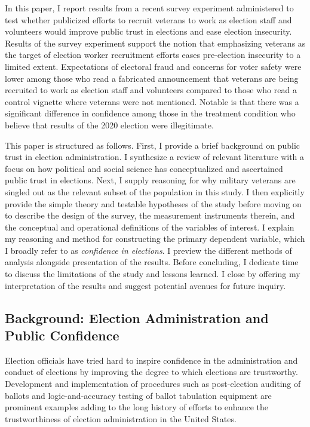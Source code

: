 \documentclass[
  12pt,
  letterpaper,
]{article}
\begin{document}
In this paper, I report results from a recent survey experiment
administered to test whether publicized efforts to recruit veterans to
work as election staff and volunteers would improve public trust in
elections and ease election insecurity. Results of the survey experiment
support the notion that emphasizing veterans as the target of election
worker recruitment efforts eases pre-election insecurity to a limited
extent. Expectations of electoral fraud and concerns for voter safety
were lower among those who read a fabricated announcement that veterans
are being recruited to work as election staff and volunteers compared to
those who read a control vignette where veterans were not mentioned.
Notable is that there was a significant difference in confidence among
those in the treatment condition who believe that results of the 2020
election were illegitimate.

This paper is structured as follows. First, I provide a brief background
on public trust in election administration. I synthesize a review of
relevant literature with a focus on how political and social science has
conceptualized and ascertained public trust in elections. Next, I supply
reasoning for why military veterans are singled out as the relevant
subset of the population in this study. I then explicitly provide the
simple theory and testable hypotheses of the study before moving on to
describe the design of the survey, the measurement instruments therein,
and the conceptual and operational definitions of the variables of
interest. I explain my reasoning and method for constructing the primary
dependent variable, which I broadly refer to as \emph{confidence in
elections}. I preview the different methods of analysis alongside
presentation of the results. Before concluding, I dedicate time to
discuss the limitations of the study and lessons learned. I close by
offering my interpretation of the results and suggest potential avenues
for future inquiry.

\subsection{Background: Election Administration and Public
Confidence}\label{background-election-administration-and-public-confidence}

Election officials have tried hard to inspire confidence in the
administration and conduct of elections by improving the degree to which
elections are trustworthy. Development and implementation of procedures
such as post-election auditing of ballots and logic-and-accuracy testing
of ballot tabulation equipment are prominent examples adding to the long
history of efforts to enhance the trustworthiness of election
administration in the United States.
\end{document}
